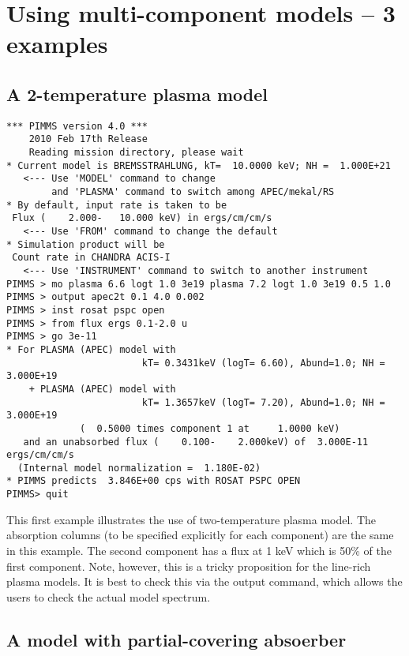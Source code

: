 \documentclass[11pt]{article}
\begin{document}
\section{Using multi-component models -- 3 examples}

\subsection{A 2-temperature plasma model}

\begin{verbatim}
*** PIMMS version 4.0 ***
    2010 Feb 17th Release
    Reading mission directory, please wait
* Current model is BREMSSTRAHLUNG, kT=  10.0000 keV; NH =  1.000E+21
   <--- Use 'MODEL' command to change
        and 'PLASMA' command to switch among APEC/mekal/RS
* By default, input rate is taken to be
 Flux (    2.000-   10.000 keV) in ergs/cm/cm/s
   <--- Use 'FROM' command to change the default
* Simulation product will be
 Count rate in CHANDRA ACIS-I
   <--- Use 'INSTRUMENT' command to switch to another instrument
PIMMS > mo plasma 6.6 logt 1.0 3e19 plasma 7.2 logt 1.0 3e19 0.5 1.0
PIMMS > output apec2t 0.1 4.0 0.002
PIMMS > inst rosat pspc open
PIMMS > from flux ergs 0.1-2.0 u
PIMMS > go 3e-11
* For PLASMA (APEC) model with
                        kT= 0.3431keV (logT= 6.60), Abund=1.0; NH =  3.000E+19
    + PLASMA (APEC) model with
                        kT= 1.3657keV (logT= 7.20), Abund=1.0; NH =  3.000E+19
             (  0.5000 times component 1 at     1.0000 keV)
   and an unabsorbed flux (    0.100-    2.000keV) of  3.000E-11 ergs/cm/cm/s
  (Internal model normalization =  1.180E-02)
* PIMMS predicts  3.846E+00 cps with ROSAT PSPC OPEN
PIMMS> quit
\end{verbatim}

This first example illustrates the use of two-temperature plasma
model.  The absorption columns (to be specified explicitly for each component)
are the same in this example.  The second component has a flux at 1 keV which
is 50\% of the first component.  Note, however, this is a tricky proposition
for the line-rich plasma models.  It is best to check this via the output
command, which allows the users to check the actual model spectrum.

\subsection{A model with partial-covering absoerber}
\end{document}
